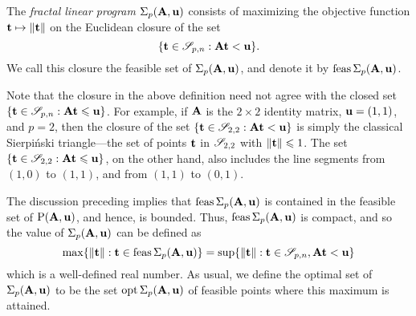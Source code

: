 \documentclass{article}
\begin{document}
\begin{definition}
\label{fractal program: D}
The \emph{fractal linear program} $\Sigma_p(\mathbf{A},\mathbf{u})$ consists of maximizing the objective function $\mathbf{t}\mapsto \| \mathbf{t} \|$ on the Euclidean closure of the set \[ \{ \mathbf{t} \in \mathscr{S}_{p,n} : \mathbf{A} \mathbf{t} < \mathbf{u} \}.\]  We call this closure the feasible set of $\Sigma_p(\mathbf{A}, \mathbf{u})$, and denote it by $\operatorname{feas} \Sigma_p(\mathbf{A}, \mathbf{u})$.
\end{definition}

\begin{remark}
Note that the closure in the above definition need not agree with the closed set $\{ \mathbf{t} \in \mathscr{S}_{p,n} : \mathbf{A} \mathbf{t} \leqslant \mathbf{u} \}$.
For example, if $\mathbf{A}$ is the $2\times 2$ identity matrix, $\mathbf{u} = (1,1)$, and $p=2$, then the closure of the set $\{ \mathbf{t} \in \mathscr{S}_{2,2} : \mathbf{A} \mathbf{t} < \mathbf{u} \}$ is simply the classical Sierpi\'nski triangle---the set of points $\mathbf{t}$ in $\mathscr{S}_{2,2}$ with $\| \mathbf{t} \| \leqslant 1$.
The set $\{ \mathbf{t} \in \mathscr{S}_{2,2} : \mathbf{A} \mathbf{t} \leqslant \mathbf{u} \}$, on the other hand, also includes the line segments from $(1,0)$ to $(1,1)$, and from $(1,1)$ to $(0,1)$.
\end{remark}

The discussion preceding  implies that $\operatorname{feas} \Sigma_p(\mathbf{A}, \mathbf{u})$ is contained in the feasible set of $\mathrm{P}(\mathbf{A}, \mathbf{u})$, and hence, is bounded.
Thus, $\operatorname{feas} \Sigma_p(\mathbf{A}, \mathbf{u})$ is compact, and so the value of $\Sigma_p(\mathbf{A}, \mathbf{u})$ can be defined as
\[
   \max \{ \| \mathbf{t} \|: \mathbf{t} \in \operatorname{feas} \Sigma_p(\mathbf{A}, \mathbf{u}) \} = \sup \{ \| \mathbf{t} \| : \mathbf{t} \in \mathscr{S}_{p,n}, \mathbf{A} \mathbf{t} < \mathbf{u} \}
\]
which is a well-defined real number.
As usual, we define the optimal set of $\Sigma_p(\mathbf{A}, \mathbf{u})$ to be the set $\operatorname{opt} \Sigma_p(\mathbf{A}, \mathbf{u})$ of feasible points where this maximum is attained.
\end{document}
